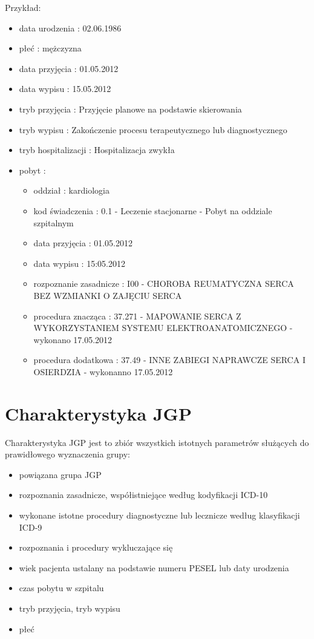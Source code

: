 Przykład:
\begin{itemize}
\item data urodzenia	: 02.06.1986
\item płeć		: mężczyzna
\item data przyjęcia	: 01.05.2012
\item data wypisu	: 15.05.2012
\item tryb przyjęcia	: Przyjęcie planowe na podstawie skierowania
\item tryb wypisu	: Zakończenie procesu terapeutycznego lub diagnostycznego
\item tryb hospitalizacji : Hospitalizacja zwykła
\item pobyt		:
 \begin{itemize}
 \item oddział		: kardiologia
 \item kod świadczenia	: 0.1 - Leczenie stacjonarne - Pobyt na oddziale szpitalnym
 \item data przyjęcia	: 01.05.2012
 \item data wypisu	: 15:05.2012
 \item rozpoznanie zasadnicze	: I00 - CHOROBA REUMATYCZNA SERCA BEZ WZMIANKI O ZAJĘCIU SERCA
 \item procedura znacząca	: 37.271 - MAPOWANIE SERCA Z WYKORZYSTANIEM SYSTEMU ELEKTROANATOMICZNEGO - wykonano 17.05.2012
 \item procedura dodatkowa	: 37.49 - INNE ZABIEGI NAPRAWCZE SERCA I OSIERDZIA - wykonanno 17.05.2012
 \end{itemize}
\end{itemize}


\section{Charakterystyka JGP}
\label{sec:charakterystykaJGP}

Charakterystyka JGP jest to zbiór wszystkich istotnych parametrów służących do prawidłowego wyznaczenia grupy:
\begin{itemize}
\item powiązana grupa JGP
\item rozpoznania zasadnicze, współistniejące według kodyfikacji ICD-10
\item wykonane istotne procedury diagnostyczne lub lecznicze według klasyfikacji ICD-9
\item rozpoznania i procedury wykluczające się
\item wiek pacjenta ustalany na podstawie numeru PESEL lub daty urodzenia
\item czas pobytu w szpitalu
\item tryb przyjęcia, tryb wypisu
\item płeć
\end{itemize}

